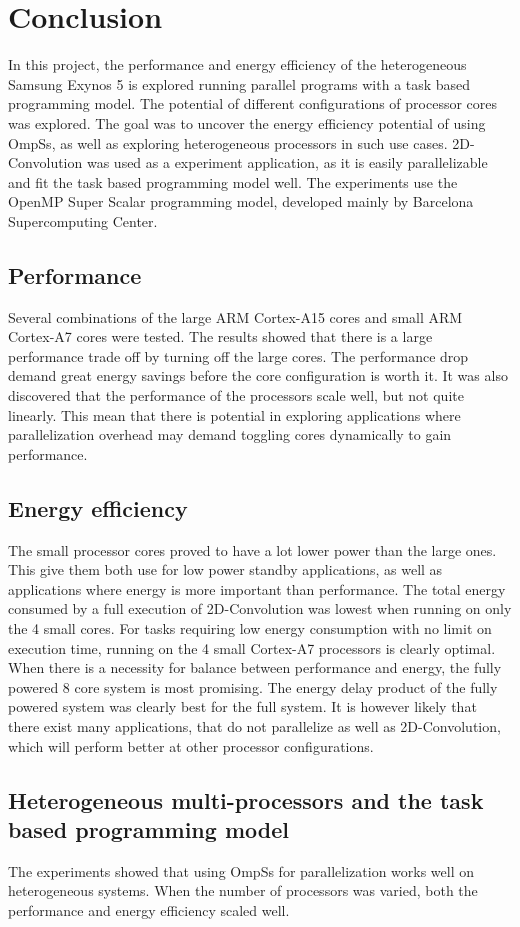 \chapter[Conclusion]{Conclusion}
In this project, the performance and energy efficiency of the heterogeneous Samsung Exynos 5 is explored running parallel programs with a task based programming model.
The potential of different configurations of processor cores was explored.
The goal was to uncover the energy efficiency potential of using OmpSs, as well as exploring heterogeneous processors in such use cases.
2D-Convolution was used as a experiment application, as it is easily parallelizable and fit the task based programming model well.
The experiments use the OpenMP Super Scalar programming model, developed mainly by Barcelona Supercomputing Center.

\section{Performance}
Several combinations of the large ARM Cortex-A15 cores and small ARM Cortex-A7 cores were tested.
The results showed that there is a large performance trade off by turning off the large cores.
The performance drop demand great energy savings before the core configuration is worth it.
It was also discovered that the performance of the processors scale well, but not quite linearly.
This mean that there is potential in exploring applications where parallelization overhead may demand toggling cores dynamically to gain performance.

\section{Energy efficiency}
The small processor cores proved to have a lot lower power than the large ones.
This give them both use for low power standby applications, as well as applications where energy is more important than performance.
The total energy consumed by a full execution of 2D-Convolution was lowest when running on only the 4 small cores.
For tasks requiring low energy consumption with no limit on execution time, running on the 4 small Cortex-A7 processors is clearly optimal.
When there is a necessity for balance between performance and energy, the fully powered 8 core system is most promising.
The energy delay product of the fully powered system was clearly best for the full system.
It is however likely that there exist many applications, that do not parallelize as well as 2D-Convolution, which will perform better at other processor configurations.

\section{Heterogeneous multi-processors and the task based programming model}
The experiments showed that using OmpSs for parallelization works well on heterogeneous systems.
When the number of processors was varied, both the performance and energy efficiency scaled well.
